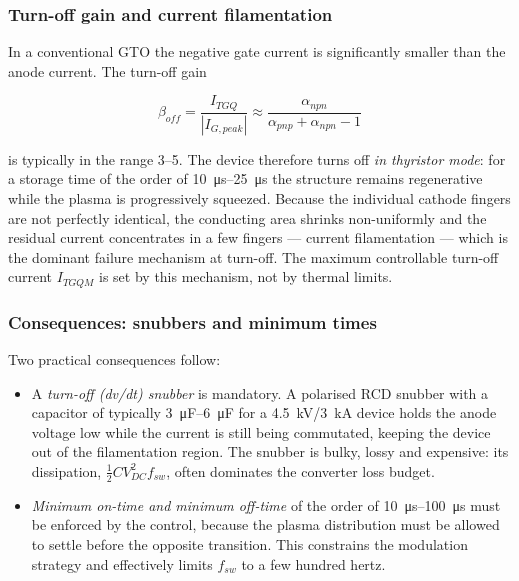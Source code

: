 \subsubsection{Turn-off gain and current filamentation}

In a conventional GTO the negative gate current is significantly smaller than
the anode current. The turn-off gain

\begin{equation}
\beta_{off} = \frac{I_{TGQ}}{|I_{G,peak}|} \approx \frac{\alpha_{npn}}{\alpha_{pnp} + \alpha_{npn} - 1}
\end{equation}

is typically in the range \numrange{3}{5}. The device therefore turns off
\emph{in thyristor mode}: for a storage time of the order of
\SIrange{10}{25}{\micro\second} the structure remains regenerative while the
plasma is progressively squeezed. Because the individual cathode fingers are not
perfectly identical, the conducting area shrinks non-uniformly and the residual
current concentrates in a few fingers --- current filamentation --- which is the
dominant failure mechanism at turn-off. The maximum controllable turn-off
current $I_{TGQM}$ is set by this mechanism, not by thermal limits.

\subsubsection{Consequences: snubbers and minimum times}

Two practical consequences follow:

\begin{itemize}[nosep]
  \item A \emph{turn-off (dv/dt) snubber} is mandatory. A polarised RCD snubber
        with a capacitor of typically \SIrange{3}{6}{\micro\farad} for a
        \SI{4.5}{\kilo\volt}/\SI{3}{\kilo\ampere} device holds the anode voltage
        low while the current is still being commutated, keeping the device out
        of the filamentation region. The snubber is bulky, lossy and expensive:
        its dissipation, $\tfrac{1}{2}C V_{DC}^{2} f_{sw}$, often dominates the
        converter loss budget.
  \item \emph{Minimum on-time and minimum off-time} of the order of
        \SIrange{10}{100}{\micro\second} must be enforced by the control, because
        the plasma distribution must be allowed to settle before the opposite
        transition. This constrains the modulation strategy and effectively
        limits $f_{sw}$ to a few hundred hertz.
\end{itemize}


